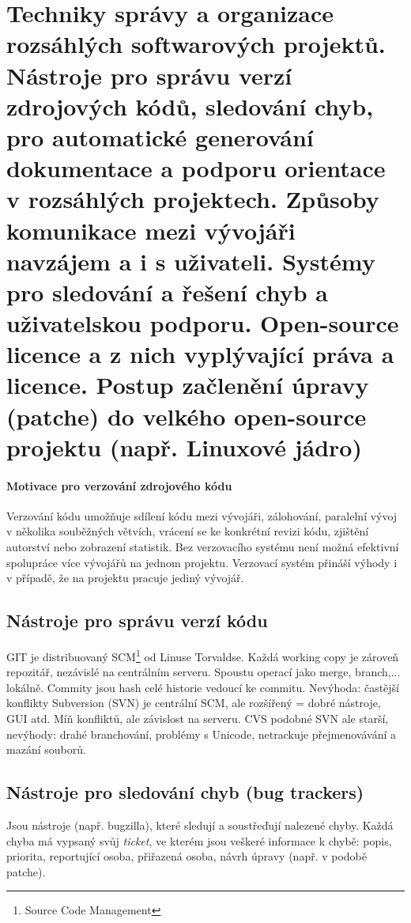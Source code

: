 \section[OSP - Open source,git,lincence]{Techniky správy a organizace rozsáhlých softwarových projektů. Nástroje pro správu verzí zdrojových kódů, sledování chyb, pro automatické generování dokumentace a podporu orientace v rozsáhlých projektech. Způsoby komunikace mezi vývojáři navzájem a i s uživateli. Systémy pro sledování a řešení chyb a uživatelskou podporu. Open-source licence a z nich vyplývající práva a licence. Postup začlenění úpravy (patche) do velkého open-source projektu (např. Linuxové jádro)}

\paragraph{Motivace pro verzování zdrojového kódu} Verzování kódu umožňuje sdílení kódu mezi vývojáři, zálohování, paralelní vývoj v několika souběžných větvích, vrácení se ke konkrétní revizi kódu, zjištění autorství nebo zobrazení statistik. Bez verzovacího systému není možná efektivní spolupráce více vývojářů na jednom projektu. Verzovací systém přináší výhody i v případě, že na projektu pracuje jediný vývojář.

\subsection{Nástroje pro správu verzí kódu}
GIT je distribuovaný SCM\footnote{Source Code Management} od Linuse Torvaldse. Každá working copy je zároveň repozitář, nezávislé na centrálním serveru. Spoustu operací jako merge, branch,... lokálně. Commity jsou hash celé historie vedoucí ke commitu. Nevýhoda: častější konflikty Subversion (SVN) je centrální SCM, ale rozšířený = dobré nástroje, GUI atd. Míň konfliktů, ale závislost na serveru. CVS podobné SVN ale starší, nevýhody: drahé branchování, problémy s Unicode, netrackuje přejmenovávání a mazání souborů.

\subsection{Nástroje pro sledování chyb (bug trackers)} Jsou nástroje (např. bugzilla), které sledují a soustřeďují nalezené chyby. Každá chyba má vypsaný svůj \textit{ticket}, ve kterém jsou veškeré informace k chybě: popis, priorita, reportující osoba, přiřazená osoba, návrh úpravy (např. v podobě patche).


